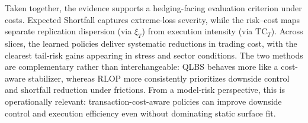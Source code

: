 Taken together, the evidence supports a hedging-facing evaluation criterion under costs. Expected Shortfall captures extreme-loss severity, while the risk--cost maps separate replication dispersion (via $\xi_T$) from execution intensity (via $\mathrm{TC}_T$). Across slices, the learned policies deliver systematic reductions in trading cost, with the clearest tail-risk gains appearing in stress and sector conditions. The two methods are complementary rather than interchangeable: QLBS behaves more like a cost-aware stabilizer, whereas RLOP more consistently prioritizes downside control and shortfall reduction under frictions. 
From a model-risk perspective, this is operationally relevant: transaction-cost-aware policies can improve downside control and execution efficiency even without dominating static surface fit.
